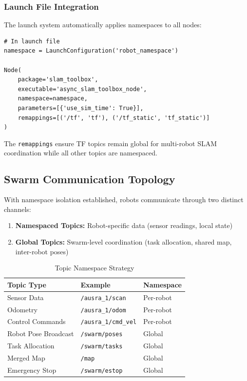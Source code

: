 \subsubsection{Launch File Integration}

The launch system automatically applies namespaces to all nodes:

\begin{verbatim}
# In launch file
namespace = LaunchConfiguration('robot_namespace')

Node(
    package='slam_toolbox',
    executable='async_slam_toolbox_node',
    namespace=namespace,
    parameters=[{'use_sim_time': True}],
    remappings=[('/tf', 'tf'), ('/tf_static', 'tf_static')]
)
\end{verbatim}

The \texttt{remappings} ensure TF topics remain global for multi-robot SLAM coordination while all other topics are namespaced.

\subsection{Swarm Communication Topology}

With namespace isolation established, robots communicate through two distinct channels:

\begin{enumerate}
    \item \textbf{Namespaced Topics:} Robot-specific data (sensor readings, local state)
    \item \textbf{Global Topics:} Swarm-level coordination (task allocation, shared map, inter-robot poses)
\end{enumerate}

\begin{table}[H]
\centering
\caption{Topic Namespace Strategy}
\label{tab:topic_namespace}
\begin{tabular}{|l|l|l|}
\hline
\textbf{Topic Type} & \textbf{Example} & \textbf{Namespace} \\
\hline
Sensor Data & \texttt{/ausra\_1/scan} & Per-robot \\
Odometry & \texttt{/ausra\_1/odom} & Per-robot \\
Control Commands & \texttt{/ausra\_1/cmd\_vel} & Per-robot \\
Robot Pose Broadcast & \texttt{/swarm/poses} & Global \\
Task Allocation & \texttt{/swarm/tasks} & Global \\
Merged Map & \texttt{/map} & Global \\
Emergency Stop & \texttt{/swarm/estop} & Global \\
\hline
\end{tabular}
\end{table}

